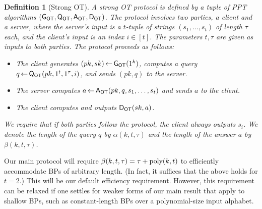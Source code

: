 \documentclass[11pt]{article}
\newtheorem{definition}[theorem]{Definition}
\newcommand{\from}{{\,\leftarrow\,}}
\newcommand{\poly}{{\mbox{\rm poly}}}
\newcommand{\genot}{{\sf G_{OT}}}
\newcommand{\queot}{{\sf Q_{OT}}}
\newcommand{\ansot}{{\sf A_{OT}}}
\newcommand{\decot}{{\sf D_{OT}}}
\newcommand{\otl}{{\tau}}
\newcommand{\samp}[2]{#1\from #2}
\begin{document}
\begin{definition}[Strong OT]
\label{def-ot} A {\em strong OT} protocol is defined by a tuple of
PPT algorithms $(\genot,\queot,\ansot,\decot)$. The protocol
involves two parties, a client and a server, where the server's
input is a $t$-tuple of strings $(s_1,\ldots,s_t)$ of length $\otl$
each, and the client's input is an index $i\in[t]$. The parameters
$t,\otl$ are given as inputs to both parties. The protocol proceeds
as follows:
\begin{itemize}
 \item The client generates $\samp{(pk,sk)}{\genot(1^k)}$, computes a
query $\samp{q}{\queot(pk,1^t,1^\otl,i)}$, and sends $(pk,q)$ to the
server.
 \item  The server computes $\samp{a}{\ansot(pk,q,s_1,\ldots,s_t)}$
and sends $a$ to the client.
 \item  The client computes and outputs $\decot(sk,a)$.
\end{itemize}
We require that if both parties follow the protocol, the client
always outputs $s_i$. We denote the length of the query $q$ by
$\alpha(k,t,\otl)$ and the length of the answer $a$ by
$\beta(k,t,\otl)$.
\end{definition}
Our main protocol will require $\beta(k,t,\otl)=\otl+\poly(k,t)$ to
efficiently accommodate BPs of arbitrary length. (In fact, it
suffices that the above holds for $t=2$.) This will be our default
efficiency requirement. However, this requirement can be relaxed if
one settles for weaker forms of our main result that apply to
shallow BPs, such as constant-length BPs over a polynomial-size
input alphabet.
\end{document}
